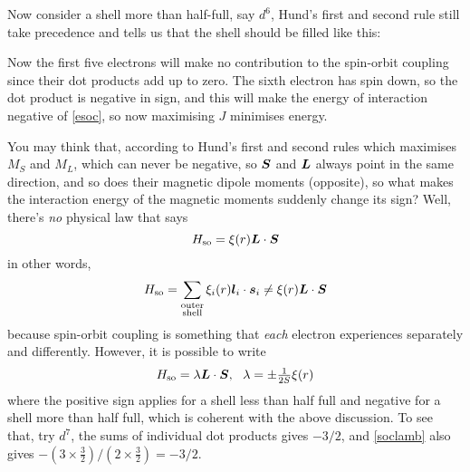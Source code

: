 Now consider a shell more than half-full, say $d^6$, Hund's first and second rule still take precedence and tells us that the shell should be filled like this: 
\begin{center}
\end{center}
Now the first five electrons will make no contribution to the spin-orbit coupling since their dot products add up to zero. The sixth electron has spin down, so the dot product is negative in sign, and this will make the energy of interaction negative of \cref{esoc}, so now maximising $J$ minimises energy.\par
You may think that, according to Hund's first and second rules which maximises $M_S$ and $M_L$, which can never be negative, so $\boldsymbol{S}$ and $\boldsymbol{L}$ always point in the same direction, and so does their magnetic dipole moments (opposite), so what makes the interaction energy of the magnetic moments suddenly change its sign? Well, there's \emph{no} physical law that says
\begin{equation}
	H_{\mathrm{so}}=\xi(r)\boldsymbol{L}\cdot\boldsymbol{S} 	
\end{equation}
in other words,
\begin{equation}
 	H_{\mathrm{so}}=\sum_{\substack{\text{outer} \\ \text{shell}}}\xi_i(r)\boldsymbol{l}_i\cdot\boldsymbol{s}_i\neq\xi(r)\boldsymbol{L}\cdot\boldsymbol{S}
\end{equation} 
because spin-orbit coupling is something that \emph{each} electron experiences separately and differently. However, it is possible to write
\begin{equation}
\label{soclamb}
	H_{\mathrm{so}}=\lambda\bvec{L}\cdot\bvec{S},\ \ \lambda=\pm\tfrac{1}{2S}\xi(r)
\end{equation}
where the positive sign applies for a shell less than half full and negative for a shell more than half full, which is coherent with the above discussion. To see that, try $d^7$, the sums of individual dot products gives $-3/2$, and \cref{soclamb} also gives $-(3\times\frac{3}{2})/(2\times\frac{3}{2})=-3/2$. 
